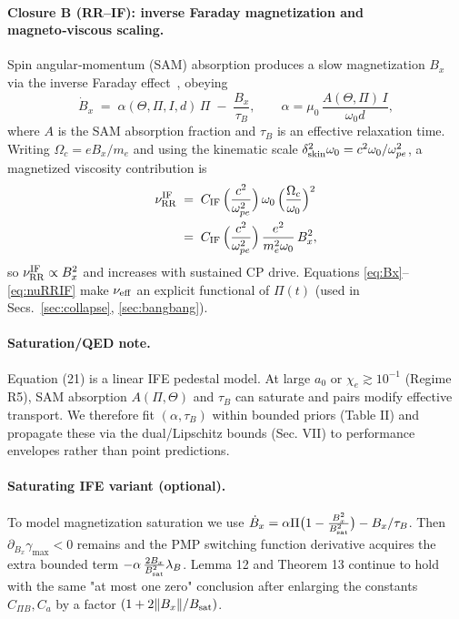 \documentclass[aps,pre,twocolumn,showpacs,superscriptaddress]{revtex4-2}
\theoremstyle{definition}
\begin{document}
\paragraph{Closure B (RR–IF): inverse Faraday magnetization and magneto‑viscous scaling.}
Spin angular‑momentum (SAM) absorption produces a slow magnetization $B_x$ via the inverse Faraday effect~\cite{Liseykina2016NJP_IFE}, obeying
\begin{equation}\label{eq:Bx}
\dot{B}_x \;=\; \alpha(\Theta,\Pi,I,d)\,\Pi \;-\; \frac{B_x}{\tau_B},\qquad 
\alpha=\mu_0\,\frac{A(\Theta,\Pi)\,I}{\omega_0 d},
\end{equation}
where $A$ is the SAM absorption fraction and $\tau_B$ is an effective relaxation time. Writing $\Omega_c=eB_x/m_e$ and using the kinematic scale $\delta_{\rm skin}^2 \omega_0=c^2\omega_0/\omega_{pe}^2$, a magnetized viscosity contribution is
\begin{align}\label{eq:nuRRIF}
\nu_{\rm RR}^{\rm IF} &\;=\; C_{\rm IF}\,\Big(\frac{c^2}{\omega_{pe}^2}\Big)\,\omega_0\,\Big(\frac{\Omega_c}{\omega_0}\Big)^2\nonumber\\
&\;=\; C_{\rm IF}\,\Big(\frac{c^2}{\omega_{pe}^2}\Big)\,\frac{e^2}{m_e^2\omega_0}\,B_x^2,
\end{align}
so $\nu_{\rm RR}^{\rm IF}\propto B_x^2$ and increases with sustained CP drive. Equations \eqref{eq:Bx}–\eqref{eq:nuRRIF} make $\nu_{\rm eff}$ an explicit functional of $\Pi(t)$ (used in Secs.~\ref{sec:collapse}, \ref{sec:bangbang}).

\paragraph*{Saturation/QED note.}
Equation (21) is a linear IFE pedestal model. At large $a_0$ or $\chi_e\gtrsim 10^{-1}$ (Regime R5), SAM absorption $A(\Pi,\Theta)$ and $\tau_B$ can saturate and pairs modify effective transport. We therefore fit $(\alpha,\tau_B)$ within bounded priors (Table II) and propagate these via the dual/Lipschitz bounds (Sec. VII) to performance envelopes rather than point predictions.

\paragraph*{Saturating IFE variant (optional).}
To model magnetization saturation we use $\dot B_x=\alpha \Pi \big(1-\tfrac{B_x^2}{B_{\rm sat}^2}\big)-B_x/\tau_B$. Then $\partial_{B_x}\gamma_{\max}<0$ remains and the PMP switching function derivative acquires the extra bounded term $-\alpha\,\tfrac{2B_x}{B_{\rm sat}^2}\lambda_B$. Lemma 12 and Theorem 13 continue to hold with the same "at most one zero" conclusion after enlarging the constants $C_{\Pi B},C_a$ by a factor $(1+2\|B_x\|/B_{\rm sat})$.
\end{document}
